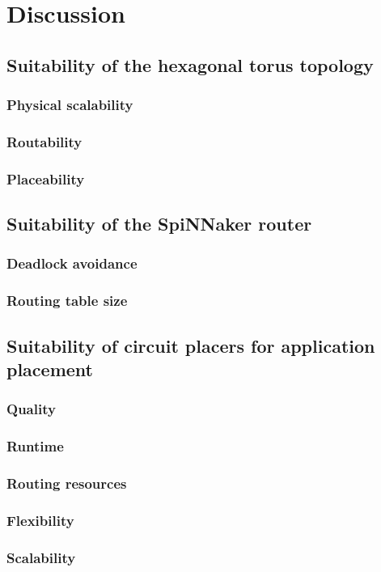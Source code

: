 \chapter{Discussion}

\section{Suitability of the hexagonal torus topology}
	\subsection{Physical scalability}
	\subsection{Routability}
	\subsection{Placeability}

\section{Suitability of the SpiNNaker router}
	\subsection{Deadlock avoidance}
	\subsection{Routing table size}

\section{Suitability of circuit placers for application placement}
	\subsection{Quality}
	\subsection{Runtime}
	\subsection{Routing resources}
	\subsection{Flexibility}
	\subsection{Scalability}

